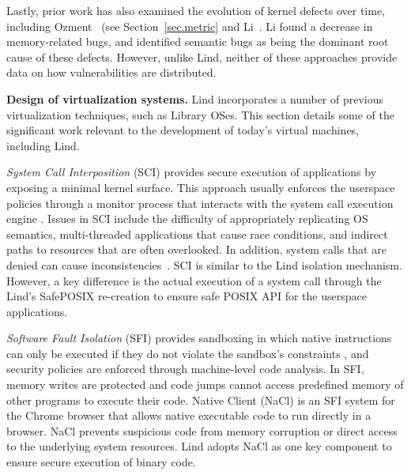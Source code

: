 {Lastly, prior work has also examined the evolution of kernel defects over time, including
Ozment~\cite{ozment2006milk} (see Section~\ref{sec.metric} and Li~\cite{li2006have}.
Li found a decrease in memory-related
bugs, and identified semantic bugs as being the dominant root cause of these
defects.
However, unlike Lind, neither of these approaches provide data
on how vulnerabilities are distributed.


\textbf{Design of virtualization systems.}
Lind incorporates a number of previous virtualization techniques, such as Library OSes.
This section details some
of the significant work relevant to the development of today's virtual machines,
including Lind.

\textit{System Call Interposition} (SCI) provides
secure execution of applications by exposing a minimal kernel surface.
This approach usually enforces the userspace policies through a monitor process that
interacts with the system call execution engine
\cite{SCI-04}.
Issues in SCI include the difficulty of appropriately replicating OS semantics,
multi-threaded applications that cause race conditions, and indirect paths to
resources that are often overlooked.
In addition, system calls that are denied can cause inconsistencies~\cite{Problems-SCI}.
SCI is similar to the Lind isolation mechanism. However, a key difference is the actual execution
of a system call through the Lind's SafePOSIX re-creation to ensure safe POSIX API for the userspace applications.

\textit{Software Fault Isolation} (SFI)
provides sandboxing in which native
instructions can only be executed if they do not violate the sandbox's
constraints \cite{SFI:93}, and security policies are enforced through machine-level
code analysis. In SFI, memory
writes are protected and code jumps cannot access predefined memory of
other programs to execute their code.
Native Client (NaCl) \cite{NaCl-09} is an SFI system for the
Chrome browser that allows native executable code to run directly in a
browser. NaCl prevents suspicious code
from memory corruption or direct access to the underlying system
resources. Lind adopts NaCl as one key component to ensure secure execution
of binary code.

}
